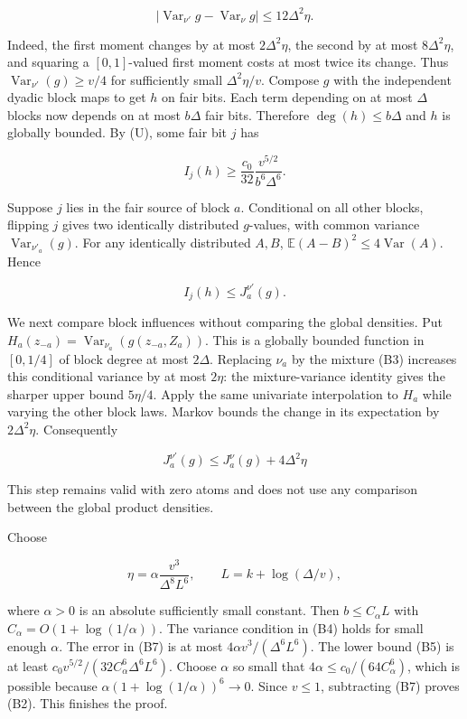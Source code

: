 \[
 |\operatorname{Var}_{\nu'}g-\operatorname{Var}_{\nu}g|
 \le12\Delta^2\eta.
 \tag{B4}
\]

Indeed, the first moment changes by at most \(2\Delta^2\eta\), the
second by at most \(8\Delta^2\eta\), and squaring a \([0,1]\)-valued
first moment costs at most twice its change. Thus
\(\operatorname{Var}_{\nu'}(g)\ge v/4\) for sufficiently small
\(\Delta^2\eta/v\). Compose \(g\) with the independent dyadic block maps
to get \(h\) on fair bits. Each term depending on at most \(\Delta\)
blocks now depends on at most \(b\Delta\) fair bits. Therefore
\(\deg(h)\le b\Delta\) and \(h\) is globally bounded. By (U), some fair
bit \(j\) has

\[
 I_j(h)\ge \frac{c_0}{32}
             \frac{v^{5/2}}{b^6\Delta^6}.
 \tag{B5}
\]

Suppose \(j\) lies in the fair source of block \(a\). Conditional on all
other blocks, flipping \(j\) gives two identically distributed
\(g\)-values, with common variance \(\operatorname{Var}_{\nu'_a}(g)\).
For any identically distributed \(A,B\),
\(\mathbb E(A-B)^2\le4\operatorname{Var}(A)\). Hence

\[
 I_j(h)\le J_a^{\nu'}(g).
 \tag{B6}
\]

We next compare block influences without comparing the global densities.
Put \(H_a(z_{-a})=\operatorname{Var}_{\nu_a}(g(z_{-a},Z_a))\). This is a
globally bounded function in \([0,1/4]\) of block degree at most
\(2\Delta\). Replacing \(\nu_a\) by the mixture (B3) increases this
conditional variance by at most \(2\eta\): the mixture-variance identity
gives the sharper upper bound \(5\eta/4\). Apply the same univariate
interpolation to \(H_a\) while varying the other block laws. Markov
bounds the change in its expectation by \(2\Delta^2\eta\). Consequently

\[
 J_a^{\nu'}(g)
 \le J_a^\nu(g)+4\Delta^2\eta
 \tag{B7}
\]

This step remains valid with zero atoms and does not use any comparison
between the global product densities.

Choose

\[
 \eta=\alpha\frac{v^3}{\Delta^8 L^6},
 \qquad L=k+\log(\Delta/v),
 \tag{B8}
\]

where \(\alpha>0\) is an absolute sufficiently small constant. Then
\(b\le C_\alpha L\) with \(C_\alpha=O(1+\log(1/\alpha))\). The variance
condition in (B4) holds for small enough \(\alpha\). The error in (B7)
is at most \(4\alpha v^3/(\Delta^6L^6)\). The lower bound (B5) is at
least \(c_0v^{5/2}/(32C_\alpha^6\Delta^6L^6)\). Choose \(\alpha\) so
small that \(4\alpha\le c_0/(64C_\alpha^6)\), which is possible because
\(\alpha(1+\log(1/\alpha))^6\to0\). Since \(v\le1\), subtracting (B7)
proves (B2). This finishes the proof.
